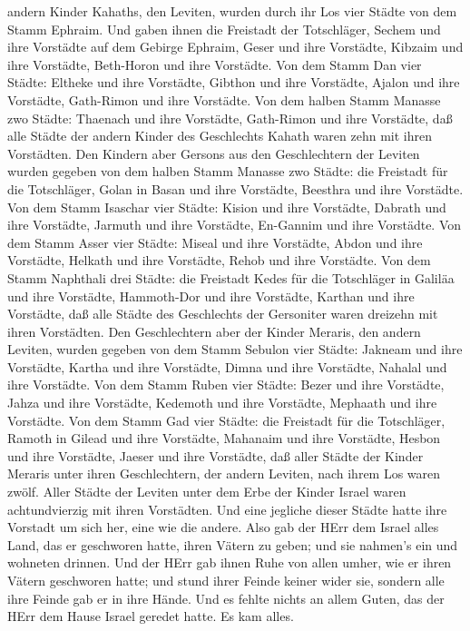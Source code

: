 andern Kinder Kahaths, den Leviten, wurden durch ihr Los vier Städte von
dem Stamm Ephraim.  Und gaben ihnen die Freistadt der
Totschläger, Sechem und ihre Vorstädte auf dem Gebirge Ephraim, Geser
und ihre Vorstädte,  Kibzaim und ihre Vorstädte, Beth-Horon
und ihre Vorstädte.  Von dem Stamm Dan vier Städte: Eltheke
und ihre Vorstädte, Gibthon und ihre Vorstädte,  Ajalon und
ihre Vorstädte, Gath-Rimon und ihre Vorstädte.  Von dem
halben Stamm Manasse zwo Städte: Thaenach und ihre Vorstädte, Gath-Rimon
und ihre Vorstädte,  daß alle Städte der andern Kinder des
Geschlechts Kahath waren zehn mit ihren Vorstädten.  Den
Kindern aber Gersons aus den Geschlechtern der Leviten wurden gegeben
von dem halben Stamm Manasse zwo Städte: die Freistadt für die
Totschläger, Golan in Basan und ihre Vorstädte, Beesthra und ihre
Vorstädte.  Von dem Stamm Isaschar vier Städte: Kision und
ihre Vorstädte, Dabrath und ihre Vorstädte,  Jarmuth und
ihre Vorstädte, En-Gannim und ihre Vorstädte.  Von dem
Stamm Asser vier Städte: Miseal und ihre Vorstädte, Abdon und ihre
Vorstädte,  Helkath und ihre Vorstädte, Rehob und ihre
Vorstädte.  Von dem Stamm Naphthali drei Städte: die
Freistadt Kedes für die Totschläger in Galiläa und ihre Vorstädte,
Hammoth-Dor und ihre Vorstädte, Karthan und ihre Vorstädte,
 daß alle Städte des Geschlechts der Gersoniter waren
dreizehn mit ihren Vorstädten.  Den Geschlechtern aber der
Kinder Meraris, den andern Leviten, wurden gegeben von dem Stamm Sebulon
vier Städte: Jakneam und ihre Vorstädte, Kartha und ihre Vorstädte,
 Dimna und ihre Vorstädte, Nahalal und ihre Vorstädte.
 Von dem Stamm Ruben vier Städte: Bezer und ihre Vorstädte,
Jahza und ihre Vorstädte,  Kedemoth und ihre Vorstädte,
Mephaath und ihre Vorstädte.  Von dem Stamm Gad vier
Städte: die Freistadt für die Totschläger, Ramoth in Gilead und ihre
Vorstädte,  Mahanaim und ihre Vorstädte, Hesbon und ihre
Vorstädte, Jaeser und ihre Vorstädte,  daß aller Städte der
Kinder Meraris unter ihren Geschlechtern, der andern Leviten, nach ihrem
Los waren zwölf.  Aller Städte der Leviten unter dem Erbe
der Kinder Israel waren achtundvierzig mit ihren Vorstädten.
 Und eine jegliche dieser Städte hatte ihre Vorstadt um
sich her, eine wie die andere.  Also gab der HErr dem
Israel alles Land, das er geschworen hatte, ihren Vätern zu geben; und
sie nahmen's ein und wohneten drinnen.  Und der HErr gab
ihnen Ruhe von allen umher, wie er ihren Vätern geschworen hatte; und
stund ihrer Feinde keiner wider sie, sondern alle ihre Feinde gab er in
ihre Hände.  Und es fehlte nichts an allem Guten, das der
HErr dem Hause Israel geredet hatte. Es kam alles.

